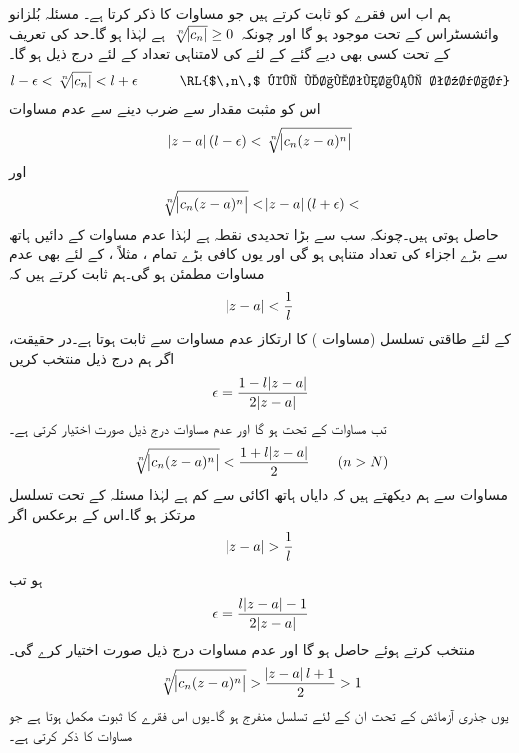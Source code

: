 ہم اب اس فقرے کو ثابت کرتے ہیں جو مساوات  کا ذکر کرتا ہے۔ مسئلہ بُلزانو وائشسٹراس  کے تحت  موجود ہو گا اور چونکہ
$\,\sqrt[\leftroot{-2}n]{\abs{c_n}}\ge 0\,$
ہے لہٰذا  ہو گا۔حد کی تعریف کے تحت کسی بھی دیے گئے  کے لئے  کی لامتناہی تعداد کے لئے درج ذیل ہو گا۔
\begin{align*}
l-\epsilon<\sqrt[\leftroot{-2}n]{\abs{c_n}}<l+\epsilon\quad \quad \quad \text{\RL{$\,n\,$ کی لامتناہی تعداد}}
\end{align*}
اس کو مثبت مقدار  سے ضرب دینے سے عدم مساوات
\begin{align}\label{مساوات_ٹیلر_رداس_ارتکاز_پ}
\abs{z-a}(l-\epsilon)<\sqrt[\leftroot{-2}n]{\abs{c_n(z-a)^n}}
\end{align}
اور
\begin{align}\label{مساوات_ٹیلر_رداس_ارتکاز_ت}
\sqrt[\leftroot{-2}n]{\abs{c_n(z-a)^n}}<\abs{z-a}(l+\epsilon)<
\end{align}
حاصل ہوتی ہیں۔چونکہ  سب سے بڑا تحدیدی نقطہ ہے لہٰذا  عدم مساوات  کے دائیں ہاتھ سے بڑے اجزاء کی تعداد متناہی ہو گی اور یوں 
 کافی بڑے تمام ، مثلاً ، کے لئے بھی عدم مساوات  مطمئن ہو گی۔ہم ثابت کرتے ہیں کہ
\begin{align}\label{مساوات_ٹیلر_رداس_ارتکاز_ٹ}
\abs{z-a}<\frac{1}{l}
\end{align}
کے لئے طاقتی تسلسل (مساوات ) کا ارتکاز  عدم مساوات  سے ثابت ہوتا ہے۔در حقیقت، اگر ہم درج ذیل منتخب کریں
\begin{align*}
\epsilon=\frac{1-l\abs{z-a}}{2\abs{z-a}}
\end{align*}
تب مساوات  کے تحت  ہو گا اور عدم مساوات  درج ذیل صورت اختیار کرتی ہے۔
\begin{align*}
\sqrt[\leftroot{-2}n]{\abs{c_n(z-a)^n}}<\frac{1+l\abs{z-a}}{2}\quad \quad (n>N)
\end{align*}
مساوات  سے ہم دیکھتے ہیں کہ دایاں ہاتھ اکائی سے کم ہے لہٰذا مسئلہ  کے تحت تسلسل مرتکز ہو گا۔اس کے برعکس اگر 
\begin{align*}
\abs{z-a}>\frac{1}{l}
\end{align*}
ہو تب
\begin{align*}
\epsilon=\frac{l\abs{z-a}-1}{2\abs{z-a}}
\end{align*}
منتخب کرتے ہوئے  حاصل ہو گا اور  عدم مساوات  درج ذیل صورت اختیار کرے گی۔
\begin{align*}
\sqrt[\leftroot{-2}n]{\abs{c_n(z-a)^n}}>\frac{\abs{z-a}l+1}{2}>1
\end{align*}
یوں جذری آزمائش کے تحت ان  کے لئے تسلسل منفرج ہو گا۔یوں اس فقرے کا ثبوت مکمل ہوتا ہے  جو مساوات  کا ذکر کرتی ہے۔

